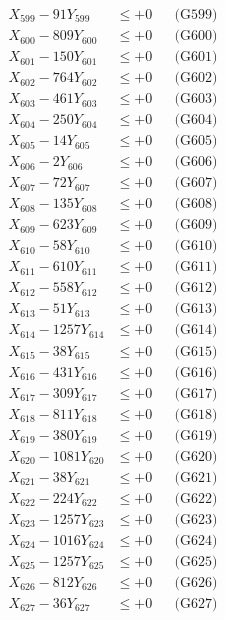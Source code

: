 \documentclass[a4paper,10pt]{article}
\begin{document}
{\begin{align}
X_{599} - 91Y_{599} &\leq +0 && \text{(G599)} \\
X_{600} - 809Y_{600} &\leq +0 && \text{(G600)} \\
\allowbreak
X_{601} - 150Y_{601} &\leq +0 && \text{(G601)} \\
X_{602} - 764Y_{602} &\leq +0 && \text{(G602)} \\
X_{603} - 461Y_{603} &\leq +0 && \text{(G603)} \\
X_{604} - 250Y_{604} &\leq +0 && \text{(G604)} \\
X_{605} - 14Y_{605} &\leq +0 && \text{(G605)} \\
X_{606} - 2Y_{606} &\leq +0 && \text{(G606)} \\
X_{607} - 72Y_{607} &\leq +0 && \text{(G607)} \\
X_{608} - 135Y_{608} &\leq +0 && \text{(G608)} \\
X_{609} - 623Y_{609} &\leq +0 && \text{(G609)} \\
X_{610} - 58Y_{610} &\leq +0 && \text{(G610)} \\
\allowbreak
X_{611} - 610Y_{611} &\leq +0 && \text{(G611)} \\
X_{612} - 558Y_{612} &\leq +0 && \text{(G612)} \\
X_{613} - 51Y_{613} &\leq +0 && \text{(G613)} \\
X_{614} - 1257Y_{614} &\leq +0 && \text{(G614)} \\
X_{615} - 38Y_{615} &\leq +0 && \text{(G615)} \\
X_{616} - 431Y_{616} &\leq +0 && \text{(G616)} \\
X_{617} - 309Y_{617} &\leq +0 && \text{(G617)} \\
X_{618} - 811Y_{618} &\leq +0 && \text{(G618)} \\
X_{619} - 380Y_{619} &\leq +0 && \text{(G619)} \\
X_{620} - 1081Y_{620} &\leq +0 && \text{(G620)} \\
\allowbreak
X_{621} - 38Y_{621} &\leq +0 && \text{(G621)} \\
X_{622} - 224Y_{622} &\leq +0 && \text{(G622)} \\
X_{623} - 1257Y_{623} &\leq +0 && \text{(G623)} \\
X_{624} - 1016Y_{624} &\leq +0 && \text{(G624)} \\
X_{625} - 1257Y_{625} &\leq +0 && \text{(G625)} \\
X_{626} - 812Y_{626} &\leq +0 && \text{(G626)} \\
X_{627} - 36Y_{627} &\leq +0 && \text{(G627)} \\

\end{align}}
\end{document}
